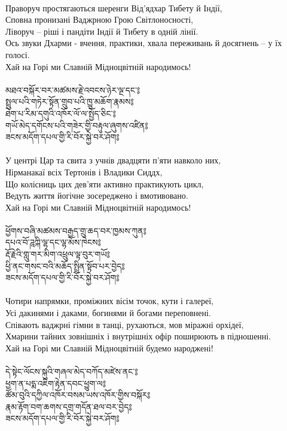 \\
\ru
Праворуч простягаються шеренги Від'ядхар Тибету й Індії, \\
Сповна пронизані Ваджрною Грою Світлоносності, \\
Ліворуч -- ріші і пандіти Індії й Тибету в одній лінії.\\
Ось звуки Дхарми - вчення, практики, хвала переживань й досягнень -- у їх голосі.\\
Хай на Горі ми Славній Мідноцвітній народимось!\\
\\
{\ti མཐའ་བསྐོར་བར་མཚམས་རྗེ་འབངས་ཉེར་ལྔ་དང་༔\\
སྤྲུལ་པའི་གཏེར་སྟོན་གྲུབ་པའི་ཁྱུ་མཆོག་རྣམས༔\\
ཐེག་པ་རིམ་དགུའི་འཁོར་ལོ་ལ་སྤྱོད་ཅིང་༔\\
གཡོ་མེད་དགོངས་པའི་གཟེར་གྱི་བརྟུལ་ཞུགས་འཛིན༔\\
ཟངས་མདོག་དཔལ་གྱི་རི་བོར་སྐྱེ་བར་ཤོག༔}\\
\\
\ru
У центрі Цар та свита з учнів двадцяти п'яти навколо них,\\
Нірманакаї всіх Тертонів і Владики Сиддх,\\
Що колісниць цих дев'яти активно практикують цикл,\\
Ведуть життя йогічне зосереджено і вмотивовано.\\
Хай на Горі ми Славній Мідноцвітній народимось!\\
\\
{\ti ཕྱོགས་བཞི་མཚམས་བརྒྱད་གྲུ་ཆད་བར་ཁྱམས་ཀུན༔\\
དཔའ་བོ་ཌཱཀྐི་ལྷ་དང་ལྷ་མོས་ཁེངས༔\\
རྡོ་རྗེའི་གླུ་གར་མིག་འཕྲུལ་ལྟ་བུར་གཡོ༔\\
ཕྱི་ནང་གསང་བའི་མཆོད་སྤྲིན་སྟོབ་པར་བྱེད༔\\
ཟངས་མདོག་དཔལ་གྱི་རི་བོར་སྐྱེ་བར་ཤོག༔}\\
\\
Чотири напрямки, проміжних вісім точок, кути і галереї,\\
Усі дакинями і даками, богинями й богами переповнені.\\
Співають ваджрні гімни в танці, рухаються, мов міражні орхідеї, \\
Хмарини тайних зовнішніх і внутрішніх офір поширюють в підношенні.\\
Хай на Горі ми Славній Мідноцвітній будемо народжені!\\
\\
{\ti དེ་སྟེང་ལོངས་སྐུའི་གཞལ་མེད་བཀོད་མཛེས་ནང་༔\\
ཕྱག་ན་པདྨ་འཇིག་རྟེན་དབང་ཕྱུག་ལ༔\\
ཚོམ་བུའི་དཀྱིལ་འཁོར་བསམ་ཡས་འཁོར་གྱིས་བསྐོར༔\\
རྣམ་རྟོག་བག་ཆགས་དགྲ་གདོན་ཐལ་བར་བྱེད༔\\
ཟངས་མདོག་དཔལ་གྱི་རི་བོར་སྐྱེ་བར་ཤོག༔}\\
